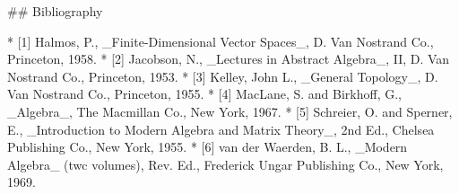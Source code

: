 

## Bibliography

* [1] Halmos, P., _Finite-Dimensional Vector Spaces_, D. Van Nostrand Co., Princeton, 1958.
* [2] Jacobson, N., _Lectures in Abstract Algebra_, II, D. Van Nostrand Co., Princeton, 1953.
* [3] Kelley, John L., _General Topology_, D. Van Nostrand Co., Princeton, 1955.
* [4] MacLane, S. and Birkhoff, G., _Algebra_, The Macmillan Co., New York, 1967.
* [5] Schreier, O. and Sperner, E., _Introduction to Modern Algebra and Matrix Theory_, 2nd Ed., Chelsea Publishing Co., New York, 1955.
* [6] van der Waerden, B. L., _Modern Algebra_ (twc volumes), Rev. Ed., Frederick Ungar Publishing Co., New York, 1969.


